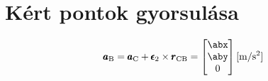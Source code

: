 \section{Kért pontok gyorsulása}

\begin{equation}
	\pmb{a}_\text{B} = \pmb{a}_\text{C} + \pmb{\epsilon}_2 \times \pmb{r}_\text{CB} =
	\begin{bmatrix}
		\abx \\ \aby \\ 0
	\end{bmatrix} \siunit{}{\m\per\second^2}
\end{equation}

\structureacceleration
